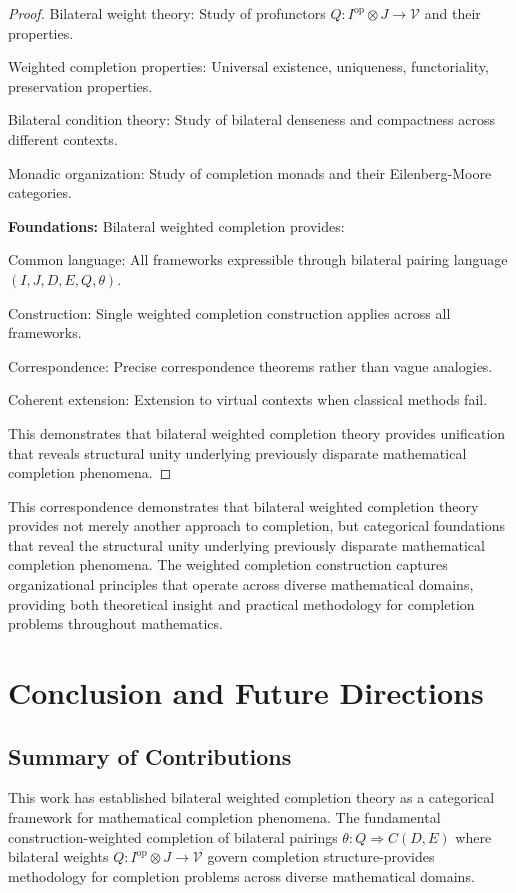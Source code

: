 \documentclass[11pt]{article}
\theoremstyle{plain}
\theoremstyle{definition}
\theoremstyle{remark}
\newcommand{\V}{\mathcal{V}}
\newcommand{\op}{\mathrm{op}}
\begin{document}
\begin{proof}
Bilateral weight theory: Study of profunctors $Q : I^{\op} \otimes J \to \V$ and their properties.

Weighted completion properties: Universal existence, uniqueness, functoriality, preservation properties.

Bilateral condition theory: Study of bilateral denseness and compactness across different contexts.

Monadic organization: Study of completion monads and their Eilenberg-Moore categories.

\textbf{Foundations:} Bilateral weighted completion provides:

Common language: All frameworks expressible through bilateral pairing language $(I, J, D, E, Q, \theta)$.

Construction: Single weighted completion construction applies across all frameworks.

Correspondence: Precise correspondence theorems rather than vague analogies.

Coherent extension: Extension to virtual contexts when classical methods fail.

This demonstrates that bilateral weighted completion theory provides unification that reveals structural unity underlying previously disparate mathematical completion phenomena.
\end{proof}

This correspondence demonstrates that bilateral weighted completion theory provides not merely another approach to completion, but categorical foundations that reveal the structural unity underlying previously disparate mathematical completion phenomena. The weighted completion construction captures organizational principles that operate across diverse mathematical domains, providing both theoretical insight and practical methodology for completion problems throughout mathematics.

\section{Conclusion and Future Directions}

\subsection{Summary of Contributions}

This work has established bilateral weighted completion theory as a categorical framework for mathematical completion phenomena. The fundamental construction-weighted completion of bilateral pairings $\theta : Q \Rightarrow C(D,E)$ where bilateral weights $Q : I^{\op} \otimes J \to \V$ govern completion structure-provides methodology for completion problems across diverse mathematical domains.
\end{document}
